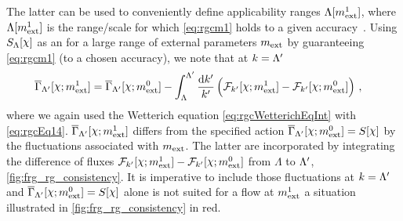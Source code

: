The latter can be used to conveniently define applicability ranges $\Lambda[m_{\mathrm{ext}}^1]$, where $\Lambda[m_{\mathrm{ext}}^1]$ is the range/scale for which \cref{eq:rgcm1} holds to a given accuracy~\cite{Braun:2018svj}.
Using $S_\Lambda[\FSsf]$ as an \ic{} for a large range of external parameters $m_{\mathrm{ext}}$ by guaranteeing \cref{eq:rgcm1} (to a chosen accuracy), we note that at $k={\Lambda'}$
\begin{align}
	\FSeaa_\LambdaP[\FSsf;m_\ext^1]&= \FSeaa_\LambdaP[\FSsf;m_\ext^0] -\int_\Lambda^\LambdaP \frac{\dif k'}{k'} \del{\FRGflow_{k'}[\FSsf;m_\ext^1]-\FRGflow_{k'}[\FSsf;m_\ext^0]}\,,
	\label{eq:rgcSLambdaPmext1}
\end{align}
where we again used the Wetterich equation \eqref{eq:rgcWetterichEqInt} with \cref{eq:rgcEq14}.
$\FSeaa_\LambdaP[\FSsf;m_\ext^1]$ differs from the specified action $\FSeaa_\LambdaP[\FSsf;m_\ext^0]=S[\FSsf]$ by the fluctuations associated with $m_{\mathrm{ext}}$.
The latter are incorporated by integrating the difference of \frg{} fluxes $\FRGflow_{k'}[\FSsf;m_\ext^1]-\FRGflow_{k'}[\FSsf;m_\ext^0]$ from $\Lambda$ to ${\Lambda'}$, \cf{} \cref{fig:frg_rg_consistency}.
It is imperative to include those fluctuations at $k={\Lambda'}$ and $\FSeaa_\LambdaP[\FSsf;m_\ext^0]=S[\FSsf]$ alone is not suited for a flow at $m_{\mathrm{ext}}^1$ \dash{} a situation illustrated in \cref{fig:frg_rg_consistency} in red.\bigskip

